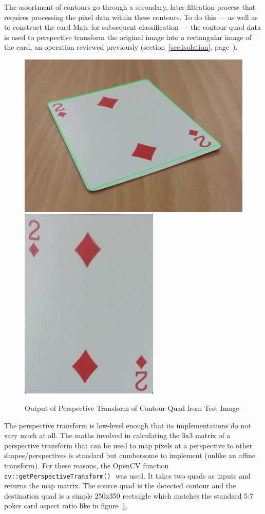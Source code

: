 \documentclass[a4paper,12pt,notitlepage]{article}
\newcommand{\secref}[1]{(section~\ref{#1}, page~\pageref{#1})}
\newcommand{\code}[1]{\colorbox{white}{\lstinline[basicstyle=\ttfamily\color{black}]|#1|} }
\begin{document}
			The assortment of contours go through a secondary, later filtration process that requires processing the pixel data within these contours. To do this --- as well as to construct the card Mats for subsequent classification --- the contour quad data is used to perspective transform the original image into a rectangular image of the card, an operation reviewed previously \secref{sec:isolation}.

			\begin{figure}[H]
				\centering
				\includegraphics[width=0.6\linewidth]{perstrans1}
				\includegraphics[width=0.3\linewidth]{perstrans2}
				\caption{Output of Perspective Transform of Contour Quad from Test Image}
				\label{fig:perstrans}
			\end{figure}

			The perspective transform is low-level enough that its implementations do not vary much at all. The maths involved in calculating the 3x3 matrix of a perspective transform that can be used to map pixels at a perspective to other shapes/perspectives is standard but cumbersome to implement (unlike an affine transform). For these reasons, the OpenCV function \code{cv::getPerspectiveTransform()} was used. It takes two quads as inputs and returns the map matrix. The source quad is the detected contour and the destination quad is a simple 250x350 rectangle which matches the standard 5:7 poker card aspect ratio like in figure~\ref{fig:perstrans}.
\end{document}
